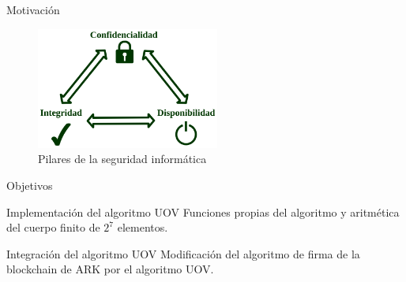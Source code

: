 \documentclass[10pt,aspectratio=169,]{beamer}
\begin{document}

\begin{frame}[c]{Motivación}
	\begin{figure}
		\centering
		\includegraphics[height=4cm]{CIA.png}
		\caption{\large{Pilares de la seguridad informática}}
	\end{figure}
\end{frame}

\begin{frame}[c]{Objetivos}
	\begin{exampleblock}{\large Implementación del algoritmo UOV}
		Funciones propias del algoritmo y aritmética del cuerpo finito de $2^7$ elementos.
	\end{exampleblock}

	\begin{exampleblock}{\large Integración del algoritmo UOV}
		Modificación del algoritmo de firma de la blockchain de ARK por el algoritmo UOV.
	\end{exampleblock}
\end{frame}
\end{document}
